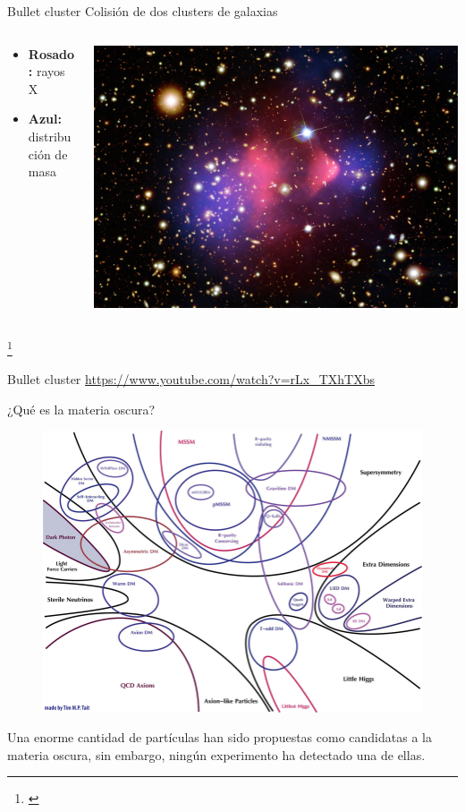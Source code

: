 \documentclass[handout]{beamer}
\newcommand\blfootnote[1]
{%
	\begingroup
	\renewcommand\thefootnote{}\footnote{#1}%
	\addtocounter{footnote}{-1}%
	\endgroup
}
\newcommand{\fcite}[1]{\blfootnote{\cite{#1}}}
\begin{document}
\begin{frame}{Bullet cluster}
	Colisión de dos clusters de galaxias
	\begin{columns}
		\begin{column}{0.4\textwidth}
			\begin{itemize}\small
				\item \textbf{Rosado:} rayos X
				\item \textbf{Azul:} distribución de masa
			\end{itemize}
		\end{column}
		\begin{column}{0.6\textwidth}
			\includegraphics[width = \linewidth]{sources/images/bullet}
		\end{column}
	\end{columns}
	\fcite{brownstein2007bullet}
\end{frame}

\begin{frame}{Bullet cluster}
	\vspace{1cm}
	{\footnotesize
		\url{https://www.youtube.com/watch?v=rLx_TXhTXbs}
	}
\end{frame}

\begin{frame}{¿Qué es la materia oscura?}\small
	\begin{figure}[h]
		\centering
		\includegraphics[width = 0.7\linewidth]{sources/images/candidates}
	\end{figure}
	
	Una enorme cantidad de partículas han sido propuestas como candidatas a la materia oscura, sin embargo, ningún experimento ha detectado una de ellas. 
\end{frame}
\end{document}
